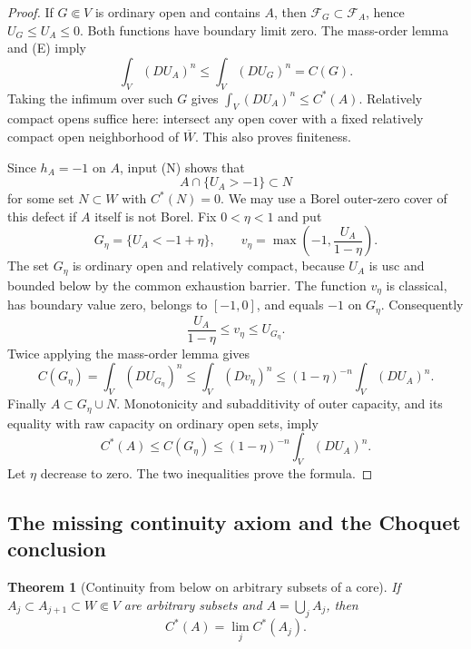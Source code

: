 \documentclass[11pt,a4paper]{article}
\numberwithin{equation}{section}
\newtheorem{theorem}{Theorem}[section]
\theoremstyle{definition}
\theoremstyle{remark}
\begin{document}
\begin{proof}
If $G\Subset V$ is ordinary open and contains $A$, then
$\mathcal F_G\subset\mathcal F_A$, hence $U_G\leq U_A\leq0$.
Both functions have boundary limit zero. The mass-order lemma and
\textup{(E)} imply
\[
 \int_V(DU_A)^n\leq\int_V(DU_G)^n=C(G).
\]
Taking the infimum over such $G$ gives
$\int_V(DU_A)^n\leq C^*(A)$. Relatively compact opens suffice here:
intersect any open cover with a fixed relatively compact open
neighborhood of $\overline W$. This also proves finiteness.

Since $h_A=-1$ on $A$, input \textup{(N)} shows that
\[
 A\cap\{U_A>-1\}\subset N
\]
for some set $N\subset W$ with $C^*(N)=0$. We may use a Borel
outer-zero cover of this defect if $A$ itself is not Borel.
Fix $0<\eta<1$ and put
\[
 G_\eta=\{U_A<-1+\eta\},\qquad
 v_\eta=\max\left(-1,\frac{U_A}{1-\eta}\right).
\]
The set $G_\eta$ is ordinary open and relatively compact, because
$U_A$ is usc and bounded below by the common exhaustion barrier.
The function $v_\eta$ is classical, has boundary value zero,
belongs to $[-1,0]$, and equals $-1$ on $G_\eta$. Consequently
\[
 \frac{U_A}{1-\eta}\leq v_\eta\leq U_{G_\eta}.
\]
Twice applying the mass-order lemma gives
\[
 C(G_\eta)=\int_V(DU_{G_\eta})^n
 \leq\int_V(Dv_\eta)^n
 \leq(1-\eta)^{-n}\int_V(DU_A)^n.
\]
Finally $A\subset G_\eta\cup N$. Monotonicity and subadditivity
of outer capacity, and its equality with raw capacity on ordinary
open sets, imply
\[
 C^*(A)\leq C(G_\eta)
 \leq(1-\eta)^{-n}\int_V(DU_A)^n.
\]
Let $\eta$ decrease to zero. The two inequalities prove the formula.
\end{proof}

\subsection{The missing continuity axiom and the Choquet conclusion}

\begin{theorem}[Continuity from below on arbitrary subsets of a core]
\label{thm:r2-outer-capacity-increasing-sets}
If $A_j\subset A_{j+1}\subset W\Subset V$ are arbitrary subsets
and $A=\bigcup_jA_j$, then
\[
 C^*(A)=\lim_j C^*(A_j).
\]
\end{theorem}
\end{document}
